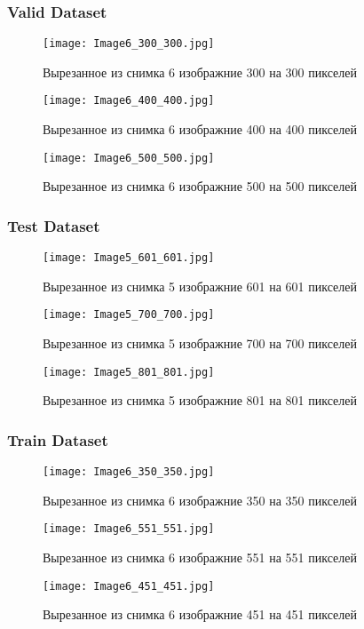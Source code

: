 \documentclass[12pt, a4paper]{report}
\begin{document}
	\subsubsection*{Valid Dataset}
	\large
	\begin{figure}[H]
		\texttt{[image: Image6\_300\_300.jpg]}
		\caption{Вырезанное из снимка 6 изображние 300 на 300 пикселей}
	\end{figure}
	\begin{figure}[H]
		\texttt{[image: Image6\_400\_400.jpg]}
		\caption{Вырезанное из снимка 6 изображние 400 на 400 пикселей}
	\end{figure}
	\begin{figure}[H]
		\texttt{[image: Image6\_500\_500.jpg]}
		\caption{Вырезанное из снимка 6 изображние 500 на 500 пикселей}
	\end{figure}

	\newpage

	\subsubsection*{Test Dataset}
	\large
	\begin{figure}[H]
		\texttt{[image: Image5\_601\_601.jpg]}
		\caption{Вырезанное из снимка 5 изображние 601 на 601 пикселей}
	\end{figure}
	\begin{figure}[H]
		\texttt{[image: Image5\_700\_700.jpg]}
		\caption{Вырезанное из снимка 5 изображние 700 на 700 пикселей}
	\end{figure}
	\begin{figure}[H]
		\texttt{[image: Image5\_801\_801.jpg]}
		\caption{Вырезанное из снимка 5 изображние 801 на 801 пикселей}
	\end{figure}

	\newpage

	\subsubsection*{Train Dataset}
	\large
	\begin{figure}[H]
		\texttt{[image: Image6\_350\_350.jpg]}
		\caption{Вырезанное из снимка 6 изображние 350 на 350 пикселей}
	\end{figure}
	\begin{figure}[H]
		\texttt{[image: Image6\_551\_551.jpg]}
		\caption{Вырезанное из снимка 6 изображние 551 на 551 пикселей}
	\end{figure}
	\begin{figure}[H]
		\texttt{[image: Image6\_451\_451.jpg]}
		\caption{Вырезанное из снимка 6 изображние 451 на 451 пикселей}
	\end{figure}
\end{document}
